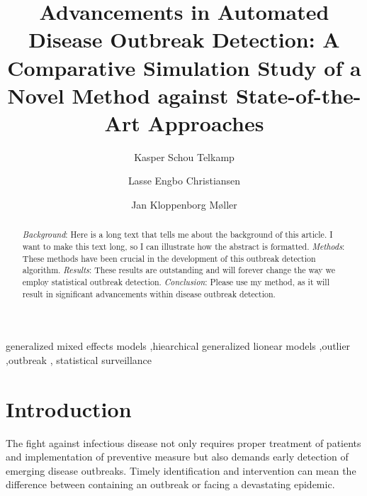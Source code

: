 \documentclass[preprint, 3p, authoryear]{elsarticle} %
\begin{document}
\begin{frontmatter}

  \title{Advancements in Automated Disease Outbreak Detection: A Comparative Simulation Study of a Novel Method against State-of-the-Art Approaches}
    \author[Epidemiology Research]{Kasper Schou Telkamp%
  }
    \author[Epidemiology Research]{Lasse Engbo Christiansen%
  }
    \author[Department of Applied Mathematics and Computer Science]{Jan Kloppenborg Møller%
  }
  
  \begin{abstract}
  \emph{Background}: Here is a long text that tells me about the background of this
  article. I want to make this text long, so I can illustrate how the abstract
  is formatted.
  \emph{Methods}: These methods have been crucial in the development of this outbreak
  detection algorithm.
  \emph{Results}: These results are outstanding and will forever change the way we
  employ statistical outbreak detection.
  \emph{Conclusion}: Please use my method, as it will result in significant
  advancements within disease outbreak detection.
  \end{abstract}
    \begin{keyword}
    generalized mixed effects models \sep hiearchical generalized lionear models \sep outlier \sep outbreak \sep 
    statistical surveillance
  \end{keyword}
  
 \end{frontmatter}

\hypertarget{introduction}{%
\section{Introduction}\label{introduction}}

The fight against infectious disease not only requires proper treatment of patients and implementation of preventive measure but also demands early detection of emerging disease outbreaks. Timely identification and intervention can mean the difference between containing an outbreak or facing a devastating epidemic.
\end{document}
